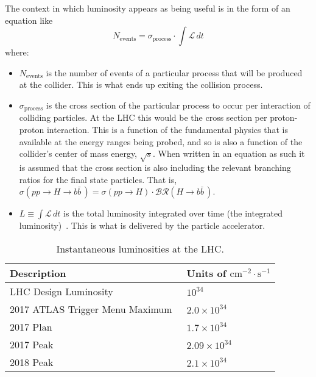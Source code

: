 The context in which luminosity appears as being useful is in the form of an equation like
\begin{equation}
 N_{\textrm{events}} = \sigma_{\textrm{process}} \cdot \int \mathscr{L}\,dt
 \label{eq:events_from_luminosity}
\end{equation}
where:
\begin{itemize}
 \item $N_{\text{events}}$ is the number of events of a particular process that will be produced at the collider.
       This is what ends up exiting the collision process.
 \item $\sigma_{\textrm{process}}$ is the cross section of the particular process to occur per interaction of colliding particles.
       At the \gls{LHC} this would be the cross section per proton-proton interaction.
       This is a function of the fundamental physics that is available at the energy ranges being probed, and so is also a function of the collider's center of mass energy, $\sqrt{s}$.
       When written in an equation as such it is assumed that the cross section is also including the relevant branching ratios for the final state particles.
       That is, ${\sigma\left(pp \to H \to b\bar{b}\,\right) = \sigma\left(pp \to H\right) \cdot \mathcal{BR}\left(H \to b\bar{b}\,\right)}$.
 \item $L \equiv \int \mathscr{L}\,dt$ is the total luminosity integrated over time (the integrated luminosity)~\cite{Herr:941318}.
       This is what is delivered by the particle accelerator.
\end{itemize}

\begin{table}[htpb]
 \centering
 \caption{Instantaneous luminosities at the LHC.}
 \begin{tabular}{@{}ll@{}} \toprule
  Description                                                    & Units of $\textrm{cm}^{-2}\cdot\textrm{s}^{-1}$ \\ \midrule
  LHC Design Luminosity~\cite{Bruning:782076}                    & $10^{34}$                                       \\
  2017 ATLAS Trigger Menu Maximum~\cite{TWiki:MenuEvolution2017} & $2.0 \times 10^{34}$                            \\
  2017 Plan~\cite{Indico:MenuCoordination_2017Lumi}              & $1.7 \times 10^{34}$                            \\
  2017 Peak~\cite{TWiki:2017ATLASPeakLumi}                       & $2.09 \times 10^{34}$                           \\
  2018 Peak~\cite{TWiki:2018ATLASPeakLumi}                       & $2.1 \times 10^{34}$                            \\
  \bottomrule
 \end{tabular}\label{table:LHC_Luminosity_Goals}%
\end{table}

